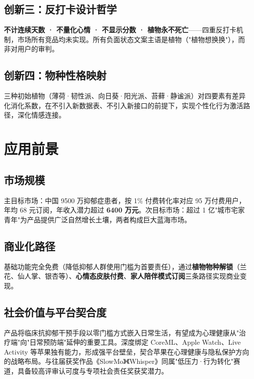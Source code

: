 \documentclass[11pt, a4paper]{article}
\newcommand{\kw}[1]{\textbf{#1}}
\begin{document}
\subsection*{创新三：反打卡设计哲学}

\kw{不计连续天数 · 不量化心情 · 不显示分数 · 植物永不死亡}——四重反打卡机制，市场所有竞品均未实现。所有负面状态文案主语是植物（"植物想换换"），而非对用户的审判。

\subsection*{创新四：物种性格映射}

三种初始植物（薄荷·韧性派、向日葵·阳光派、苔藓·静谧派）对四要素有差异化消化系数，在不引入新数据表、不引入新接口的前提下，实现个性化行为激活路径，深化情感连接。


\section{应用前景}

\subsection*{市场规模}

主目标市场：中国 9500 万抑郁症患者，按 1\% 付费转化率对应 95 万付费用户，年均 68 元订阅，年收入潜力超过 \kw{6400 万元}。次目标市场：超过 1 亿"城市宅家青年"为产品提供广泛自然增长土壤，两者构成巨大蓝海市场。

\subsection*{商业化路径}

基础功能完全免费（降低抑郁人群使用门槛为首要责任），通过\textbf{植物物种解锁}（兰花、仙人掌、银杏等）、\textbf{心情态皮肤付费}、\textbf{家人陪伴模式订阅}三条路径实现商业变现。

\subsection*{社会价值与平台契合度}

产品将临床抗抑郁干预手段以零门槛方式嵌入日常生活，有望成为心理健康从"治疗端"向"日常预防端"延伸的重要工具。深度绑定 CoreML、Apple Watch、Live Activity 等苹果独有能力，形成强平台壁垒，契合苹果在心理健康与隐私保护方向的战略布局。与往届获奖作品《SlowMo》《Whisper》同属"低压力·行为转化"赛道，具备较高评审认可度与专项社会责任奖获奖潜力。
\end{document}
